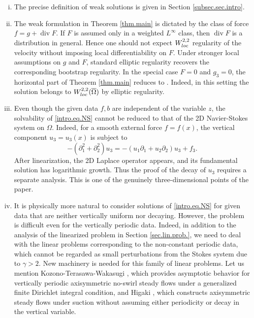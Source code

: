 \documentclass[11pt,a4paper]{article}
\numberwithin{equation}{section}
\newcommand{\opdiv}{\operatorname{div}}
\begin{document}
%
\begin{remark}\label{rem.thm.main}
\begin{enumerate}[(i)]


\item\label{item1.rem.thm.main} 
The precise definition of weak solutions is given in Section \ref{subsec.sec.intro}. 


\item\label{item2.rem.thm.main}
The weak formulation in Theorem \ref{thm.main} is dictated by the class of force $f=g+\opdiv F$. If $F$ is assumed only in a weighted $L^\infty$ class, then $\opdiv F$ is a distribution in general. Hence one should not expect $W^{2,2}_{{\rm loc}}$ regularity of the velocity without imposing local differentiability on $F$. Under stronger local assumptions on $g$ and $F$, standard elliptic regularity recovers the corresponding bootstrap regularity. In the special case $F=0$ and $g_3=0$, the horizontal part of Theorem \ref{thm.main} reduces to \cite[Theorem 1.1]{Higaki2023}. Indeed, in this setting the solution belongs to $W^{2,2}_{{\rm loc}}(\overline{\Omega})$ by elliptic regularity. 


\item\label{item3.rem.thm.main}
Even though the given data $f,b$ are independent of the variable $z$, the solvability of \eqref{intro.eq.NS} cannot be reduced to that of the 2D Navier-Stokes system on $\Omega$. Indeed, for a smooth external force $f=f(x)$, the vertical component $u_3=u_3(x)$ is subject to 
\[
-(\partial_1^2 + \partial_2^2) u_3 
= -(u_1\partial_1+u_2\partial_2)u_3 + f_3. 
\]
After linearization, the 2D Laplace operator appears, and its fundamental solution has logarithmic growth. Thus the proof of the decay of $u_3$ requires a separate analysis. This is one of the genuinely three-dimensional points of the paper. 


\item\label{item4.rem.thm.main} 
It is physically more natural to consider solutions of \eqref{intro.eq.NS} for given data that are neither vertically uniform nor decaying. However, the problem is difficult even for the vertically periodic data. Indeed, in addition to the analysis of the linearized problem in Section \ref{sec.lin.prob.}, we need to deal with the linear problems corresponding to the non-constant periodic data, which cannot be regarded as small perturbations from the Stokes system due to $\gamma>2$. New machinery is needed for this family of linear problems. Let us mention Kozono-Terasawa-Wakasugi \cite{KTW2023}, which provides asymptotic behavior for vertically periodic axisymmetric no-swirl steady flows under a generalized finite Dirichlet integral condition, and Higaki \cite{Higaki2025}, which constructs axisymmetric steady flows under suction without assuming either periodicity or decay in the vertical variable. 


\end{enumerate}
\end{remark}
%
\end{document}
